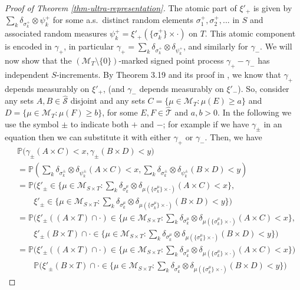 \documentclass{article}
\theoremstyle{plain}
\theoremstyle{remark}
\begin{document}
\begin{proof}[Proof of Theorem \ref{thm-ultra-representation}]
	The atomic part of $\xi'_+$ is given by $\sum_{k}\delta_{\sigma^{+}_{k}}\otimes\psi^+_k$ for some a.s.~distinct random elements $\sigma^+_1,\sigma^+_2,...$ in $S$ and associated random measures $\psi^{+}_k = \xi'_+(\{\sigma^{+}_{k}\}\times\cdot)$ on $T$. This atomic component is encoded in $\gamma_+$, in particular $\gamma_+=\sum_{k}\delta_{\sigma^{+}_{k}}\otimes\delta_{\psi^+_{k}}$, and similarly for $\gamma_-$. We will now show that the $(\mathcal{M}_T\setminus\{0\})$-marked signed point process $\gamma_+-\gamma_-$ has independent $S$-increments. By Theorem 3.19 and its proof in \cite{Kallenberg2}, we know that $\gamma_+$ depends measurably on $\xi'_+$, (and $\gamma_-$ depends measurably on $\xi'_-$). So, consider any sets $A,B\in\hat{\mathcal{S}}$ disjoint and any sets $C=\{\mu\in\mathcal{M}_T:\mu(E)\geq a\}$ and $D=\{\mu\in\mathcal{M}_T:\mu(F)\geq b\}$, for some $E,F\in\hat{\mathcal{T}}$ and $a,b>0$. In the following we use the symbol $\pm$ to indicate both $+$ and $-$; for example if we have $\gamma_\pm$ in an equation then we can substitute it with either $\gamma_+$ or $\gamma_-$. Then, we have 
	\begin{align*}
		&\mathbb{P}\Big(\gamma_\pm(A\times C)<x,\gamma_\pm(B\times D)<y\Big)\\&	=\mathbb{P}\left(\sum_{k}\delta_{\sigma^{\pm}_{k}}\otimes\delta_{\psi^\pm_{k}}(A\times C)<x,\sum_{k}\delta_{\sigma^{\pm}_{k}}\otimes\delta_{\psi^\pm_{k}}(B\times D)<y\right)\\& 	=\mathbb{P}\bigg(\xi'_{\pm}\in\{\mu\in\mathcal{M}_{S\times T}:\sum_{k}\delta_{\sigma^{\mu}_{k}}\otimes\delta_{\mu(\{\sigma^{\mu}_{k}\}\times\cdot)}(A\times C)<x\},\\&\quad\quad\xi'_{\pm}\in\{\mu\in\mathcal{M}_{S\times T}:\sum_{k}\delta_{\sigma^{\mu}_{k}}\otimes\delta_{\mu(\{\sigma^{\mu}_{k}\}\times\cdot)}(B\times D)<y\}\bigg)\\&	=\mathbb{P}\bigg(\xi'_{\pm}((A\times T)\cap\cdot)\in\{\mu\in\mathcal{M}_{S\times T}:\sum_{k}\delta_{\sigma^{\mu}_{k}}\otimes\delta_{\mu(\{\sigma^{\mu}_{k}\}\times\cdot)}(A\times C)<x\},\\&\quad\quad	\xi'_{\pm}(B\times T)\cap\cdot\in\{\mu\in\mathcal{M}_{S\times T}:\sum_{k}\delta_{\sigma^{\mu}_{k}}\otimes\delta_{\mu(\{\sigma^{\mu}_{k}\}\times\cdot)}(B\times D)<y\}\bigg)\\&	=\mathbb{P}\bigg(\xi'_{\pm}((A\times T)\cap\cdot)\in\{\mu\in\mathcal{M}_{S\times T}:\sum_{k}\delta_{\sigma^{\mu}_{k}}\otimes\delta_{\mu(\{\sigma^{\mu}_{k}\}\times\cdot)}(A\times C)<x\}\bigg)\\&	\quad\quad\mathbb{P}\bigg(\xi'_{\pm}(B\times T)\cap\cdot\in\{\mu\in\mathcal{M}_{S\times T}:\sum_{k}\delta_{\sigma^{\mu}_{k}}\otimes\delta_{\mu(\{\sigma^{\mu}_{k}\}\times\cdot)}(B\times D)<y\}\bigg)

\end{align*}
\end{proof}
\end{document}
